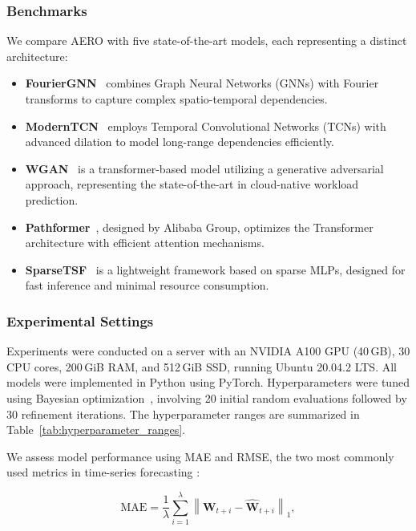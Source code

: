 \subsubsection{Benchmarks}

We compare \ac{AERO} with five state-of-the-art models, each representing a distinct architecture:

\begin{itemize}
    \item \textbf{FourierGNN}~\cite{yi2024fouriergnn} combines Graph Neural Networks (GNNs) with Fourier transforms to capture complex spatio-temporal dependencies.
    \item \textbf{ModernTCN}~\cite{donghao2024moderntcn} employs Temporal Convolutional Networks (TCNs) with advanced dilation to model long-range dependencies efficiently.
    \item \textbf{WGAN}~\cite{arbat2022wassersteinadversarialtransformercloud} is a transformer-based model utilizing a generative adversarial approach, representing the state-of-the-art in cloud-native workload prediction.
    \item \textbf{Pathformer}~\cite{pathformer2024}, designed by Alibaba Group, optimizes the Transformer architecture with efficient attention mechanisms.
    \item \textbf{SparseTSF}~\cite{sparseTSF} is a lightweight framework based on sparse \acp{MLP}, designed for fast inference and minimal resource consumption.
\end{itemize}

\subsubsection{Experimental Settings}

Experiments were conducted on a server with an NVIDIA A100 \ac{GPU} (40\,GB), 30 \ac{CPU} cores, 200\,\ac{GiB} \ac{RAM}, and 512\,\ac{GiB} \ac{SSD}, running Ubuntu 20.04.2 LTS. All models were implemented in Python using \ac{PyTorch}. Hyperparameters were tuned using Bayesian optimization~\cite{frazier2018tutorial, gridsearchvsbayesian}, involving 20 initial random evaluations followed by 30 refinement iterations. The hyperparameter ranges are summarized in Table~\ref{tab:hyperparameter_ranges}.

We assess model performance using \ac{MAE} and \ac{RMSE}, the two most commonly used metrics in time-series forecasting \cite{acmtimeseriesreview2024}:

\begin{equation}
\label{eq:mae}
\text{MAE} = \frac{1}{\lambda} \sum_{i=1}^{\lambda} \left\| \mathbf{W}_{t+i} - \hat{\mathbf{W}}_{t+i} \right\|_1,
\end{equation}


